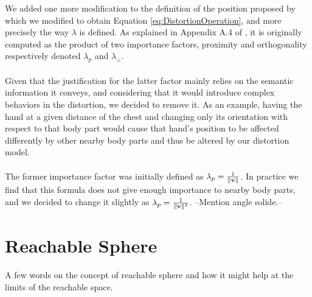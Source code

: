 We added one more modification to the definition of the position proposed by \cite{molla2017egocentric} which we modified to obtain Equation \ref{eq:DistortionOperation}, and more precisely the way $\lambda $ is defined. As explained in Appendix A.4 of \cite{molla2016precise}, it is originally computed as the product of two importance factors, proximity and orthogonality respectively denoted $\lambda_p$ and $\lambda_\bot $.
\\\\
Given that the justification for the latter factor mainly relies on the semantic information it conveys, and considering that it would introduce complex behaviors in the distortion, we decided to remove it. As an example, having the hand at a given distance of the chest and changing only its orientation with respect to that body part would cause that hand's position to be affected differently by other nearby body parts and thus be altered by our distortion model.
\\\\
The former importance factor was initially defined as $\lambda_p = \frac{1}{\lVert\mathbf{v}\rVert}$. In practice we find that this formula does not give enough importance to nearby body parts, and we decided to change it slightly as $\lambda_p = \frac{1}{\lVert\mathbf{v}\rVert^2}$. --Mention angle solide.-- %

\section{Reachable Sphere}

A few words on the concept of reachable sphere and how it might help at the limits of the reachable space.

